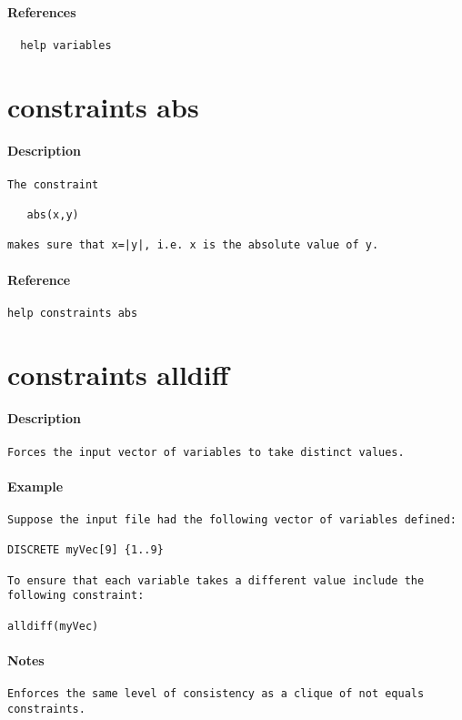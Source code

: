 \paragraph{References}
{\footnotesize
\begin{verbatim}
  help variables
\end{verbatim}
}
\section{constraints abs}
\paragraph{Description}
{\footnotesize
\begin{verbatim}
The constraint

   abs(x,y)

makes sure that x=|y|, i.e. x is the absolute value of y.
\end{verbatim}
}
\paragraph{Reference}
{\footnotesize
\begin{verbatim}
help constraints abs
\end{verbatim}
}
\section{constraints alldiff}
\paragraph{Description}
{\footnotesize
\begin{verbatim}
Forces the input vector of variables to take distinct values.
\end{verbatim}
}
\paragraph{Example}
{\footnotesize
\begin{verbatim}
Suppose the input file had the following vector of variables defined:

DISCRETE myVec[9] {1..9}

To ensure that each variable takes a different value include the
following constraint:

alldiff(myVec)
\end{verbatim}
}
\paragraph{Notes}
{\footnotesize
\begin{verbatim}
Enforces the same level of consistency as a clique of not equals
constraints.
\end{verbatim}
}
